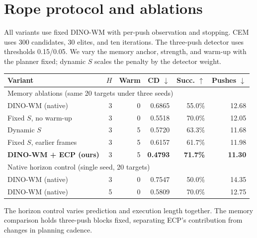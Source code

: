 \begin{table}[!t]
\begin{minipage}[t]{\columnwidth}
\section{Rope protocol and ablations}
\label{sec:rope-details}
All variants use fixed DINO-WM with per-push observation and stopping. CEM uses 300 candidates, 30 elites, and ten iterations. The three-push detector uses thresholds 0.15/0.05. We vary the memory anchor, strength, and warm-up with the planner fixed; dynamic $S$ scales the penalty by the detector weight.\par\smallskip
{\centering
{}
\label{tab:rope-ablation}
\small\setlength{\tabcolsep}{2pt}
\begin{tabular}{lrrrrr}
\toprule
Variant & $H$ & Warm & CD $\downarrow$ & Succ. $\uparrow$ & Pushes $\downarrow$\\
\midrule
\multicolumn{6}{l}{Memory ablations (same 20 targets under three seeds)}\\
DINO-WM (native) &3&0&0.6865&55.0\%&12.68\\
Fixed $S$, no warm-up&3&0&0.5518&70.0\%&12.05\\
Dynamic $S$&3&5&0.5720&63.3\%&11.68\\
Fixed $S$, earlier frames&3&5&0.6157&61.7\%&11.98\\
\textbf{DINO-WM + ECP (ours)}&3&5&\textbf{0.4793}&\textbf{71.7\%}&\textbf{11.30}\\
\midrule
\multicolumn{6}{l}{Native horizon control (single seed, 20 targets)}\\
DINO-WM (native)&3&0&0.7547&50.0\%&14.35\\
DINO-WM (native)&5&0&0.5809&70.0\%&12.75\\
\bottomrule
\end{tabular}
\par}
\par\smallskip
The horizon control varies prediction and execution length together. The memory comparison holds three-push blocks fixed, separating ECP's contribution from changes in planning cadence.
\end{minipage}\hfill
\begin{minipage}[t]{\columnwidth}
\vspace{0pt}
\par\smallskip

\end{minipage}
\end{table}
